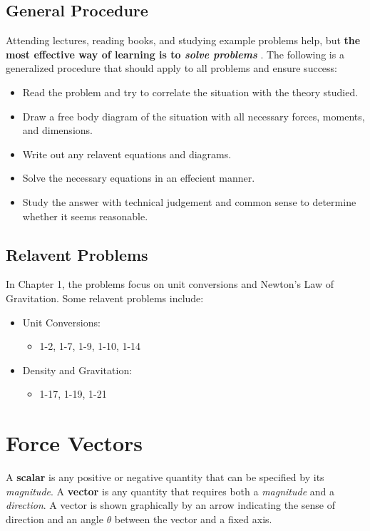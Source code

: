 \documentclass[12pt]{article}
\begin{document}
\subsection{General Procedure}
Attending lectures, reading books, and studying example problems help, but \textbf{the most effective way of learning is to \textit{solve problems}} \cite{hibbeler}.
The following is a generalized procedure that should apply to all problems and ensure success:
\begin{itemize}
    \item Read the problem and try to correlate the situation with the theory studied.
    \item Draw a free body diagram of the situation with all necessary forces, moments, and dimensions.
    \item Write out any relavent equations and diagrams.
    \item Solve the necessary equations in an effecient manner.
    \item Study the answer with technical judgement and common sense to determine whether it seems reasonable.
\end{itemize}

\subsection{Relavent Problems}
In Chapter 1, the problems focus on unit conversions and Newton's Law of Gravitation.
Some relavent problems include:
\begin{itemize}
    \item Unit Conversions:
    \begin{itemize}
        \item 1-2, 1-7, 1-9, 1-10, 1-14
    \end{itemize}
    \item Density and Gravitation:
    \begin{itemize}
        \item 1-17, 1-19, 1-21
    \end{itemize}
\end{itemize}

\pagebreak
\section{Force Vectors}
A \textbf{scalar} is any positive or negative quantity that can be specified by its \textit{magnitude}.
A \textbf{vector} is any quantity that requires both a \textit{magnitude} and a \textit{direction}.
A vector is shown graphically by an arrow indicating the sense of direction and an angle $\theta$ between the vector and a fixed axis.
\end{document}
